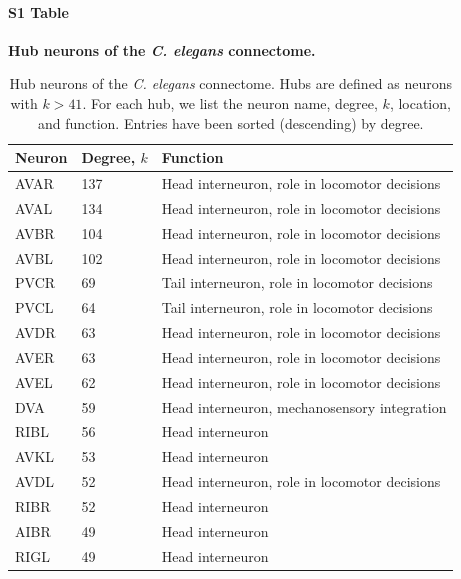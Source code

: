 \documentclass[10pt,letterpaper]{article}
\begin{document}

\paragraph*{S1 Table}
{\bf Hub neurons of the \textit{C. elegans} connectome.}
\begin{table}[h]
\centering
\caption{Hub neurons of the \textit{C. elegans} connectome.
Hubs are defined as neurons with $k>41$.
For each hub, we list the neuron name, degree, $k$, location, and function.
Entries have been sorted (descending) by degree.}
\label{tab:HubList}
\begin{tabular}{lll}
\hline
\textbf{Neuron} & \textbf{Degree, $k$} & \textbf{Function}                         \\ \hline
AVAR   & 137        & Head interneuron, role in locomotor decisions                \\
AVAL   & 134        & Head interneuron, role in locomotor decisions                \\
AVBR   & 104        & Head interneuron, role in locomotor decisions                \\
AVBL   & 102        & Head interneuron, role in locomotor decisions                \\
PVCR   & 69         & Tail interneuron, role in locomotor decisions                \\
PVCL   & 64         & Tail interneuron, role in locomotor decisions                \\
AVDR   & 63         & Head interneuron, role in locomotor decisions 				\\
AVER   & 63         & Head interneuron, role in locomotor decisions                \\
AVEL   & 62         & Head interneuron, role in locomotor decisions                \\
DVA    & 59         & Head interneuron, mechanosensory integration                \\
RIBL   & 56         & Head interneuron                							\\
AVKL   & 53         & Head interneuron                                             \\
AVDL   & 52         & Head interneuron, role in locomotor decisions                 \\
RIBR   & 52         & Head interneuron                                             \\
AIBR   & 49         & Head interneuron                                             \\
RIGL   & 49         & Head interneuron                                             \\\hline
\end{tabular}
\end{table}
\end{document}
